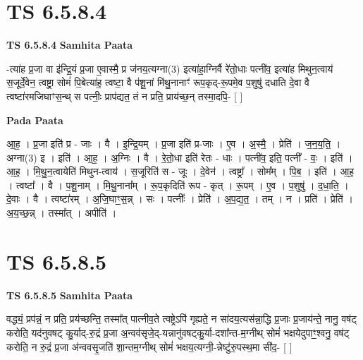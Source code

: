 \documentclass[17pt]{extarticle}
\begin{document}
\section*{ TS 6.5.8.4 }

\textbf{TS 6.5.8.4 } \newline
\textbf{Samhita Paata} \newline

-त्या॑ह प्र॒जा वा इ॑न्द्रि॒यं प्र॒जा ए॒वास्मै॒ प्र ज॑नय॒त्यग्ना(3) इत्या॑हा॒ग्निर्वै रे॑तो॒धाः पत्नी॑व॒ इत्या॑ह मिथुन॒त्वाय॑ स॒जूर्दे॒वेन॒ त्वष्ट्रा॒ सोमं॑ पि॒बेत्या॑ह॒ त्वष्टा॒ वै प॑शू॒नां मि॑थु॒नानाꣳ॑ रूप॒कृद्-रू॒पमे॒व प॒शुषु॑ दधाति दे॒वा वै त्वष्टा॑रमजिघाꣳस॒न्थ् स पत्नीः॒ प्राप॑द्यत॒ तं न प्रति॒ प्राय॑च्छ॒न् तस्मा॒दपि॒- [  ] \newline

\textbf{Pada Paata} \newline

आ॒ह॒ । प्र॒जा इति॑ प्र - जाः । वै । इ॒न्द्रि॒यम् । प्र॒जा इति॑ प्र-जाः । ए॒व । अ॒स्मै॒ । प्रेति॑ । ज॒न॒य॒ति॒ । अग्ना(3) इ । इति॑ । आ॒ह॒ । अ॒ग्निः । वै । रे॒तो॒धा इति॑ रेतः - धाः । पत्नी॑व॒ इति॒ पत्नी᳚ - वः॒ । इति॑ । आ॒ह॒ । मि॒थु॒न॒त्वायेति॑ मिथुन-त्वाय॑ । स॒जूरिति॑ स - जूः । दे॒वेन॑ । त्वष्ट्रा᳚ । सोम᳚म् । पि॒ब॒ । इति॑ । आ॒ह॒ । त्वष्टा᳚ । वै । प॒शू॒नाम् । मि॒थु॒नाना᳚म् । रू॒प॒कृदिति॑ रूप - कृत् । रू॒पम् । ए॒व । प॒शुषु॑ । द॒धा॒ति॒ । दे॒वाः । वै । त्वष्टा॑रम् । अ॒जि॒घाꣳ॒॒स॒न्न् । सः । पत्नीः᳚ । प्रेति॑ । अ॒प॒द्य॒त॒ । तम् । न । प्रति॑ । प्रेति॑ । अ॒य॒च्छ॒न्न् । तस्मा᳚त् । अपीति॑ ।  \newline




\section*{ TS 6.5.8.5 }

\textbf{TS 6.5.8.5 } \newline
\textbf{Samhita Paata} \newline

वद्ध्यं॒ प्रप॑न्नं॒ न प्रति॒ प्रय॑च्छन्ति॒ तस्मा᳚त् पात्नीव॒ते त्वष्ट्रेऽपि॑ गृह्यते॒ न सा॑दय॒त्यस॑न्ना॒द्धि प्र॒जाः प्र॒जाय॑न्ते॒ नानु॒ वष॑ट् करोति॒ यद॑नुवषट् कु॒र्याद्-रु॒द्रं प्र॒जा अ॒न्वव॑सृजे॒द्-यन्नानु॑वषट्कु॒र्या-दशा᳚न्त-म॒ग्नीथ् सोमं॑ भक्षयेदुपाꣳ॒॒श्वनु॒ वष॑ट् करोति॒ न रु॒द्रं प्र॒जा अ॑न्ववसृ॒जति॑ शा॒न्तम॒ग्नीथ् सोमं॑ भक्षय॒त्यग्नी॒-न्नेष्टु॑रु॒पस्थ॒मा सी॑द॒- [  ] \newline
\end{document}
